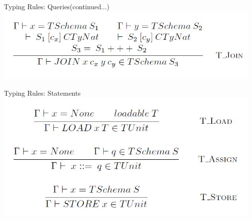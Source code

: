 \begin{frame}{Typing Rules: Queries(continued...)}
\centering
\includegraphics[scale=0.4]{Images/TypingRules/Join.JPG}
\end{frame}

\begin{frame}{Typing Rules: Statements}
\centering
\includegraphics[scale=0.4]{Images/TypingRules/Load_Assign_Store.JPG}
\end{frame}

